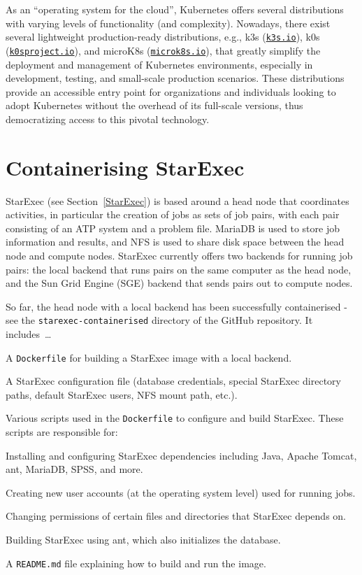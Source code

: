 \documentclass{easychair}
\newenvironment{packed_itemize}{
\vspace*{-0.3em}
\begin{itemize}
\setlength{\partopsep}{0pt}
\setlength{\itemsep}{1pt}
\setlength{\parskip}{0pt}
\setlength{\parsep}{0pt}
}{\end{itemize}}
\begin{document}
As an ``operating system for the cloud'', Kubernetes offers several distributions with varying 
levels of functionality (and complexity). 
Nowadays, there exist several lightweight production-ready distributions, e.g., 
k3s (\href{https://k3s.io/}{\tt k3s.io}), k0s (\href{https://k0sproject.io/}{\tt k0sproject.io}), 
and microK8s (\href{https://microk8s.io/}{\tt microk8s.io}), that greatly simplify the deployment 
and management of Kubernetes environments, especially in development, testing, and small-scale 
production scenarios. 
These distributions provide an accessible entry point for organizations and individuals looking 
to adopt Kubernetes without the overhead of its full-scale versions, thus democratizing access 
to this pivotal technology.

\section{Containerising StarExec}
\label{ContainerisingStarExec}

StarExec (see Section~\ref{StarExec}) is based around a head node that coordinates activities, 
in particular the creation of jobs as sets of job pairs, with each pair consisting of an ATP 
system and a problem file. 
MariaDB is used to store job information and results, and NFS is used to share disk space between 
the head node and compute nodes. 
StarExec currently offers two backends for running job pairs: the local backend that runs pairs on 
the same computer as the head node, and the Sun Grid Engine (SGE) backend that sends pairs out to 
compute nodes.

So far, the head node with a local backend has been successfully containerised - see the
{\tt starexec-containerised} directory of the GitHub repository.
It includes~\ldots
\begin{packed_itemize}
\item A {\tt Dockerfile} for building a StarExec image with a local backend.
\item A StarExec configuration file (database credentials, special StarExec directory paths, 
      default StarExec users, NFS mount path, etc.).
\item Various scripts used in the {\tt Dockerfile} to configure and build StarExec.
      These scripts are responsible for: 
      \begin{packed_itemize}
      \item Installing and configuring StarExec dependencies including Java, Apache Tomcat, ant, 
            MariaDB, SPSS, and more.
      \item Creating new user accounts (at the operating system level) used for running jobs.
      \item Changing permissions of certain files and directories that StarExec depends on.
      \item Building StarExec using ant, which also initializes the database.
      \end{packed_itemize}
\item A {\tt README.md} file explaining how to build and run the image.
\end{packed_itemize}
\end{document}
